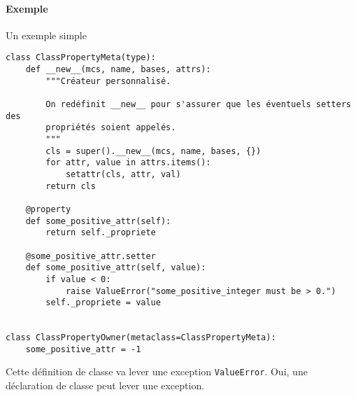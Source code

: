 \paragraph{Exemple} Un exemple simple
\begin{verbatim}
class ClassPropertyMeta(type):
    def __new__(mcs, name, bases, attrs):
        """Créateur personnalisé.
        
        On redéfinit __new__ pour s'assurer que les éventuels setters des
        propriétés soient appelés.
        """
        cls = super().__new__(mcs, name, bases, {})
        for attr, value in attrs.items():
            setattr(cls, attr, val)
        return cls

    @property
    def some_positive_attr(self):
        return self._propriete

    @some_positive_attr.setter
    def some_positive_attr(self, value):
        if value < 0:
            raise ValueError("some_positive_integer must be > 0.")
        self._propriete = value


class ClassPropertyOwner(metaclass=ClassPropertyMeta):
    some_positive_attr = -1

\end{verbatim}

Cette définition de classe va lever une exception \texttt{ValueError}. Oui, une déclaration
de classe peut lever une exception.
